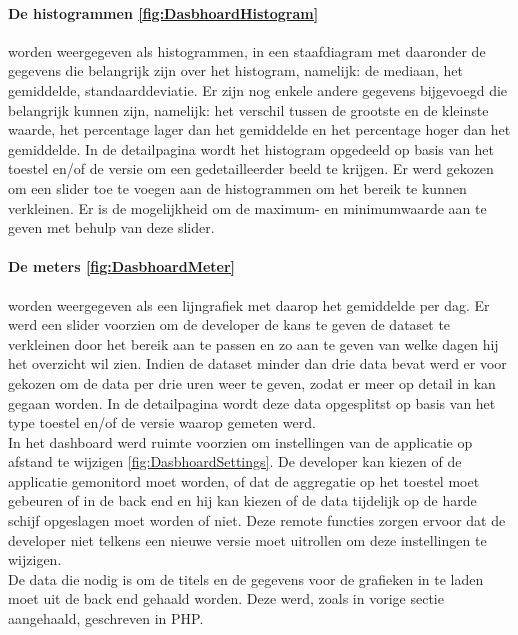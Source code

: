 \paragraph{De histogrammen \ref{fig:DasbhoardHistogram}} worden weergegeven als histogrammen, in een staafdiagram met daaronder de gegevens die belangrijk zijn over het histogram, namelijk: de mediaan, het gemiddelde, standaarddeviatie. Er zijn nog enkele andere gegevens bijgevoegd die belangrijk kunnen zijn, namelijk: het verschil tussen de grootste en de kleinste waarde, het percentage lager dan het gemiddelde en het percentage hoger dan het gemiddelde. In de detailpagina wordt het histogram opgedeeld op basis van het toestel en/of de versie om een gedetailleerder beeld te krijgen.
Er werd gekozen om een slider toe te voegen aan de histogrammen om het bereik te kunnen verkleinen. Er is de mogelijkheid om de maximum- en minimumwaarde aan te geven met behulp van deze slider. \\

\paragraph{De meters \ref{fig:DasbhoardMeter}} worden weergegeven als een lijngrafiek met daarop het gemiddelde per dag. Er werd een slider voorzien om de developer de kans te geven de dataset te verkleinen door het bereik aan te passen en zo aan te geven van welke dagen hij het overzicht wil zien. Indien de dataset minder dan drie data bevat werd er voor gekozen om de data per drie uren weer te geven, zodat er meer op detail in kan gegaan worden. In de detailpagina wordt deze data opgesplitst op basis van het type toestel en/of de versie waarop gemeten werd. \\ 


In het dashboard werd ruimte voorzien om instellingen van de applicatie op afstand te wijzigen \ref{fig:DasbhoardSettings}. De developer kan kiezen of de applicatie gemonitord moet worden, of dat de aggregatie op het toestel moet gebeuren of in de back end en hij kan kiezen of de data tijdelijk op de harde schijf opgeslagen moet worden of niet. Deze remote functies zorgen ervoor dat de developer niet telkens een nieuwe versie moet uitrollen om deze instellingen te wijzigen.\\


De data die nodig is om de titels en de gegevens voor de grafieken in te laden moet uit de back end gehaald worden. Deze werd, zoals in vorige sectie aangehaald, geschreven in PHP. \\ 

